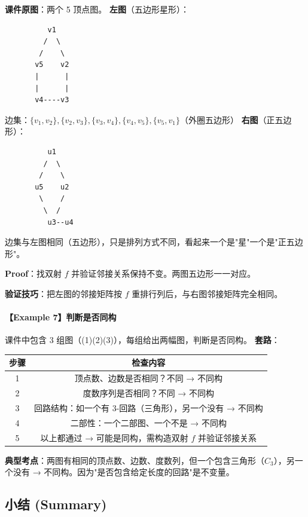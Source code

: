 \documentclass[10pt,a4paper,openany]{ctexbook}
\theoremstyle{definition}
\theoremstyle{remark}
\renewenvironment{quote}
  {\list{}{\leftmargin=1em\rightmargin=0pt\topsep=0.5pt\partopsep=0pt}\item[]}
  {\endlist}
\begin{document}
\textbf{课件原图}：两个 5 顶点图。
\textbf{左图}（五边形星形）：
{\footnotesize\begin{verbatim}
          v1
         /  \
        /    \
       v5    v2
       |      |
       |      |
       v4----v3
\end{verbatim}}

边集：$\{v_1,v_2\}, \{v_2,v_3\}, \{v_3,v_4\}, \{v_4,v_5\}, \{v_5,v_1\}$（外圈五边形）
\textbf{右图}（正五边形）：
{\footnotesize\begin{verbatim}
          u1
         /  \
        /    \
       u5    u2
        \    /
         \  /
          u3--u4
\end{verbatim}}

边集与左图相同（五边形），只是排列方式不同，看起来一个是"星"一个是"正五边形"。
\begin{quote}
\textbf{Proof}：找双射 $f$ 并验证邻接关系保持不变。两图五边形一一对应。

\textbf{验证技巧}：把左图的邻接矩阵按 $f$ 重排行列后，与右图邻接矩阵完全相同。

\end{quote}

\paragraph{【Example 7】判断是否同构}

课件中包含 3 组图（(1)(2)(3)），每组给出两幅图，判断是否同构。
\textbf{套路}：
\begin{center}
\begin{tabular}{cc}
\hline
步骤 & 检查内容 \\ \hline
1 & 顶点数、边数是否相同？不同 → 不同构 \\
2 & 度数序列是否相同？不同 → 不同构 \\
3 & 回路结构：如一个有 3-回路（三角形），另一个没有 → 不同构 \\
4 & 二部性：一个二部图、一个不是 → 不同构 \\
5 & 以上都通过 → 可能是同构，需构造双射 $f$ 并验证邻接关系 \\
\hline
\end{tabular}

\end{center}

\textbf{典型考点}：两图有相同的顶点数、边数、度数列，但一个包含三角形（$C_3$），另一个没有 → 不同构。因为"是否包含给定长度的回路"是不变量。
\vspace{-2pt}

\subsection{小结 (Summary)}
\end{document}
